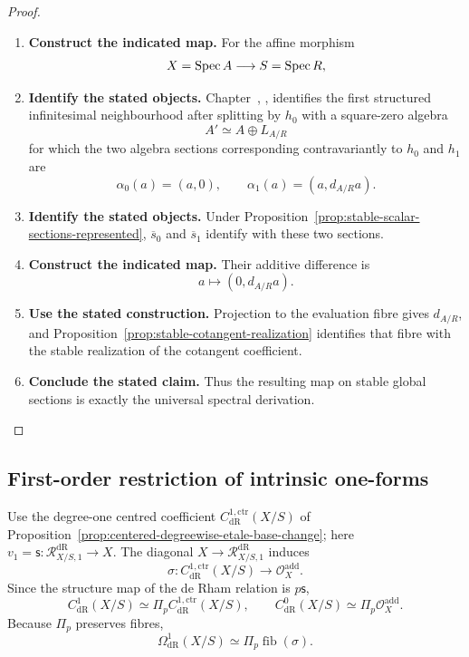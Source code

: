 \begin{proof}
\leavevmode
\begin{enumerate}[label=\textup{(\arabic*)}]
    \item \textbf{Construct the indicated map.}
    For the affine morphism
    \[
    X=\operatorname{Spec} A\longrightarrow S=\operatorname{Spec} R,
    \]
    \item \textbf{Identify the stated objects.}
    Chapter~,
    , identifies the first structured
    infinitesimal neighbourhood after splitting by \(h_0\) with a square-zero algebra
    \[
    A'\simeq A\oplus L_{A/R}
    \]
    for which the two algebra sections corresponding contravariantly to \(h_0\) and
    \(h_1\) are
    \[
    \alpha_0(a)=(a,0),
    \qquad
    \alpha_1(a)=(a,d_{A/R}a).
    \]
    \item \textbf{Identify the stated objects.}
    Under Proposition~\ref{prop:stable-scalar-sections-represented},
    \(\overline s_0\) and \(\overline s_1\) identify with these two sections.
    \item \textbf{Construct the indicated map.}
    Their
    additive difference is
    \[
    a\longmapsto(0,d_{A/R}a).
    \]
    \item \textbf{Use the stated construction.}
    Projection to the evaluation fibre gives \(d_{A/R}\), and
    Proposition~\ref{prop:stable-cotangent-realization} identifies that fibre with the
    stable realization of the cotangent coefficient.
    \item \textbf{Conclude the stated claim.}
    Thus the resulting map on stable
    global sections is exactly the universal spectral derivation.
\end{enumerate}
\end{proof}

\subsection{First-order restriction of intrinsic one-forms}

Use the degree-one centred coefficient
\(C^{1,\mathrm{ctr}}_{\mathrm{dR}}(X/S)\) of
Proposition~\ref{prop:centered-degreewise-etale-base-change}; here
\(v_1=\mathsf s:\mathcal R^{\mathrm{dR}}_{X/S,1}\to X\).
The diagonal \(X\to \mathcal R^{\mathrm{dR}}_{X/S,1}\) induces
\[
  \sigma:
  C^{1,\mathrm{ctr}}_{\mathrm{dR}}(X/S)
  \longrightarrow
  \mathcal O_X^{\mathrm{add}}.
\]
Since the structure map of the de Rham relation is \(p\mathsf s\),
\[
  C^1_{\mathrm{dR}}(X/S)
  \simeq
  \Pi_pC^{1,\mathrm{ctr}}_{\mathrm{dR}}(X/S),
  \qquad
  C^0_{\mathrm{dR}}(X/S)
  \simeq
  \Pi_p\mathcal O_X^{\mathrm{add}}.
\]
Because \(\Pi_p\) preserves fibres,
\[
  \Omega^1_{\mathrm{dR}}(X/S)
  \simeq
  \Pi_p\operatorname{fib}(\sigma).
\]

